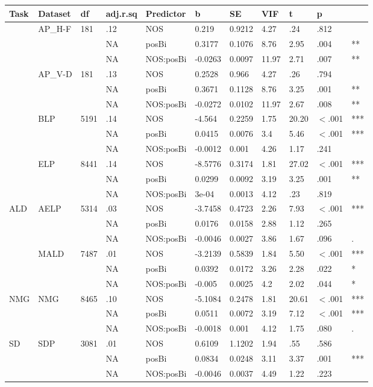 \begin{table}[ht]
\centering
\begingroup\normalsize
\begin{tabular}{lllllllllll}
  \hline
Task & Dataset & df & adj.r.sq & Predictor & b & SE & VIF & t & p &  \\ 
  \hline
 & AP\_H-F & 181 & .12 & NOS & 0.219 & 0.9212 & 4.27 & .24 & .812 &   \\ 
   &  &  & NA & posBi & 0.3177 & 0.1076 & 8.76 & 2.95 & .004 & ** \\ 
   &  &  & NA & NOS:posBi & -0.0263 & 0.0097 & 11.97 & 2.71 & .007 & ** \\ 
   & AP\_V-D & 181 & .13 & NOS & 0.2528 & 0.966 & 4.27 & .26 & .794 &   \\ 
   &  &  & NA & posBi & 0.3671 & 0.1128 & 8.76 & 3.25 & .001 & ** \\ 
   &  &  & NA & NOS:posBi & -0.0272 & 0.0102 & 11.97 & 2.67 & .008 & ** \\ 
   & BLP & 5191 & .14 & NOS & -4.564 & 0.2259 & 1.75 & 20.20 & $<$.001 & *** \\ 
   &  &  & NA & posBi & 0.0415 & 0.0076 & 3.4 & 5.46 & $<$.001 & *** \\ 
   &  &  & NA & NOS:posBi & -0.0012 & 0.001 & 4.26 & 1.17 & .241 &   \\ 
   & ELP & 8441 & .14 & NOS & -8.5776 & 0.3174 & 1.81 & 27.02 & $<$.001 & *** \\ 
   &  &  & NA & posBi & 0.0299 & 0.0092 & 3.19 & 3.25 & .001 & ** \\ 
   &  &  & NA & NOS:posBi & 3e-04 & 0.0013 & 4.12 & .23 & .819 &   \\ 
  ALD & AELP & 5314 & .03 & NOS & -3.7458 & 0.4723 & 2.26 & 7.93 & $<$.001 & *** \\ 
   &  &  & NA & posBi & 0.0176 & 0.0158 & 2.88 & 1.12 & .265 &   \\ 
   &  &  & NA & NOS:posBi & -0.0046 & 0.0027 & 3.86 & 1.67 & .096 & . \\ 
   & MALD & 7487 & .01 & NOS & -3.2139 & 0.5839 & 1.84 & 5.50 & $<$.001 & *** \\ 
   &  &  & NA & posBi & 0.0392 & 0.0172 & 3.26 & 2.28 & .022 & * \\ 
   &  &  & NA & NOS:posBi & -0.005 & 0.0025 & 4.2 & 2.02 & .044 & * \\ 
  NMG & NMG & 8465 & .10 & NOS & -5.1084 & 0.2478 & 1.81 & 20.61 & $<$.001 & *** \\ 
   &  &  & NA & posBi & 0.0511 & 0.0072 & 3.19 & 7.12 & $<$.001 & *** \\ 
   &  &  & NA & NOS:posBi & -0.0018 & 0.001 & 4.12 & 1.75 & .080 & . \\ 
  SD & SDP & 3081 & .01 & NOS & 0.6109 & 1.1202 & 1.94 & .55 & .586 &   \\ 
   &  &  & NA & posBi & 0.0834 & 0.0248 & 3.11 & 3.37 & .001 & *** \\ 
   &  &  & NA & NOS:posBi & -0.0046 & 0.0037 & 4.49 & 1.22 & .223 &   \\ 
   \hline
\end{tabular}
\endgroup
\end{table}
